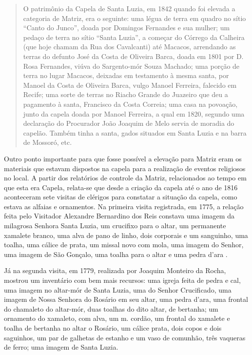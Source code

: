 \begin{refsection}
    \begin{quotation}
        O patrimônio da Capela de Santa Luzia, em 1842 quando foi elevada a categoria de Matriz, era o seguinte: uma légua de terra em quadro no sítio ``Canto do Junco'', doada por Domingos Fernandes e sua mulher; um pedaço de terra no sítio ``Santa Luzia'', a começar do Córrego da Calheira (que hoje chamam da Rua dos Cavalcanti) até Macacos, arrendando as terras do defunto José da Costa de Oliveira Barca, doada em 1801 por D. Rosa Fernandes, viúva do Sargento-mór Souza Machado; uma porção de terra no lugar Macacos, deixadas em testamento à mesma santa, por Manoel da Costa de Oliveira Barca, vulgo Manoel Ferreira, falecido em Recife; uma sorte de terras no Riacho Grande do Juazeiro que deu a pagamento à santa, Francisco da Costa Correia; uma casa na povoação, junto da capela doada por Manoel Ferreira, a qual em 1820, segundo uma declaração do Procurador João Joaquim de Melo servia de moradia do capelão. Também tinha a santa, gados situados em Santa Luzia e na barra de Mossoró, etc.
    \end{quotation}

    Outro ponto importante para que fosse possível a elevação para Matriz eram os materiais que estavam dispostos na capela para a realização de eventos religiosos no local. A partir dos relatórios de controle da Matriz, relacionados ao tempo em que esta era Capela, relata-se que desde a criação da capela até o ano de 1816 aconteceram sete visitas de clérigos para constatar a situação da capela, como estava as alfaias e ornamentos. Na primeira visita registrada, em 1775, a relação feita pelo Visitador Alexandre Bernardino dos Reis constava uma imagem da milagrosa Senhora Santa Luzia, um crucifixo para o altar, um permanente xamalete branco, uma alva de pano de linho, dois corporais e um sanguinho, uma toalha, uma cálice de prata, um missal novo com mola, uma imagem do Senhor, uma imagem de São Gonçalo, uma toalha para o altar e uma pedra d'ara \cite[p.~66]{Souza2010Historia}.

    Já na segunda visita, em 1779, realizada por Joaquim Monteiro da Rocha, mostrou um inventário com bem mais recursos: uma igreja feita de pedra e cal, uma imagem no altar-mór de Santa Luzia, uma do Senhor Crucificado, uma imagem de Nossa Senhora do Rosário em seu altar, uma pedra d'ara, uma frontal do chamaleto do altar-mór, duas toalhas do dito altar, de bertanha; um ornamento do xamaleto, com alva, um m. cordão, um frontal do xamalete e toalha de bertanha no altar o Rosário, um cálice prata, dois copos e dois saguinhos, um par de galhetas de estanho e um vaso de comunhão, três vaqueras de ferro; uma imagem de Santa Luzia.


\end{refsection}
